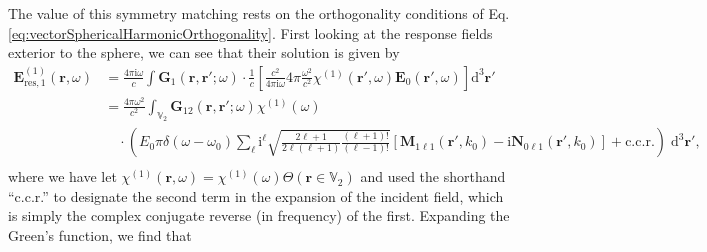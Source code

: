 \documentclass{article}
\begin{document}
The value of this symmetry matching rests on the orthogonality conditions of Eq. \ref{eq:vectorSphericalHarmonicOrthogonality}. First looking at the response fields exterior to the sphere, we can see that their solution is given by
\begin{equation}
\begin{split}
\mathbf{E}_\mathrm{res,1}^{(1)}(\mathbf{r},\omega) &= \frac{4\pi\mathrm{i}\omega}{c}\int\mathbf{G}_{1}(\mathbf{r},\mathbf{r}';\omega)\cdot\frac{1}{c}\left[\frac{c^2}{4\pi\mathrm{i}\omega}4\pi\frac{\omega^2}{c^2}\chi^{(1)}(\mathbf{r}',\omega)\mathbf{E}_0(\mathbf{r}',\omega)\right]\mathrm{d}^3\mathbf{r}'\\
&= \frac{4\pi\omega^2}{c^2}\int_{\mathbb{V}_2}\mathbf{G}_{12}(\mathbf{r},\mathbf{r}';\omega)\chi^{(1)}(\omega)\\
&\quad\cdot\left(E_0\pi\delta(\omega - \omega_0)\sum_\ell\mathrm{i}^\ell\sqrt{\frac{2\ell + 1}{2\ell(\ell + 1)}\frac{(\ell + 1)!}{(\ell - 1)!}}\left[\mathbf{M}_{1\ell 1}(\mathbf{r}',k_0) - \mathrm{i}\mathbf{N}_{0\ell 1}(\mathbf{r}',k_0)\right] + \mathrm{c.c.r.}\right)\;\mathrm{d}^3\mathbf{r}',\\
\end{split}
\end{equation}
where we have let $\chi^{(1)}(\mathbf{r},\omega) = \chi^{(1)}(\omega)\Theta(\mathbf{r}\in\mathbb{V}_2)$ and used the shorthand ``c.c.r.'' to designate the second term in the expansion of the incident field, which is simply the complex conjugate reverse (in frequency) of the first. Expanding the Green's function, we find that
\end{document}
